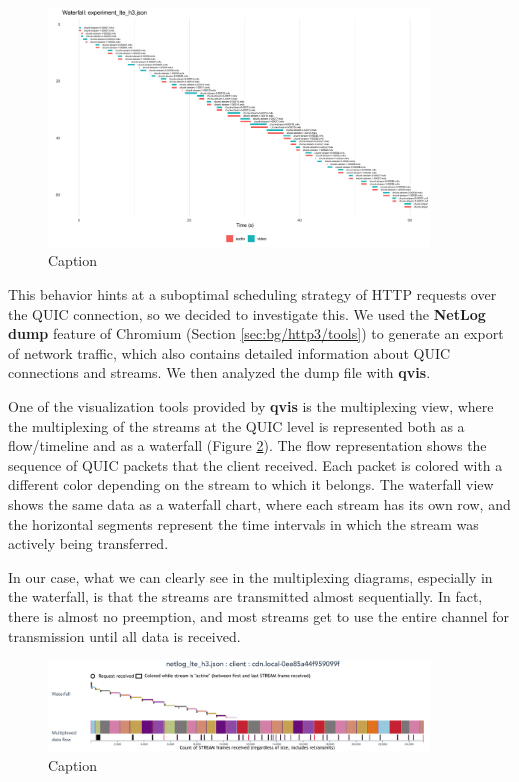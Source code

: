 \begin{figure}[h]
    \centering
    \includegraphics[width=0.9\textwidth]{res/eval_nonabr_lte_h3_waterfall.png}
    \caption{Caption}
    \label{fig:eval_nonabr_lte_h3_waterfall}
\end{figure}

This behavior hints at a suboptimal scheduling strategy of HTTP requests over the QUIC connection, so we decided to investigate this. We used the \textbf{NetLog dump} feature of Chromium (Section \ref{sec:bg/http3/tools}) to generate an export of network traffic, which also contains detailed information about QUIC connections and streams. We then analyzed the dump file with \textbf{qvis}.

One of the visualization tools provided by \textbf{qvis} is the multiplexing view, where the multiplexing of the streams at the QUIC level is represented both as a flow/timeline and as a waterfall (Figure \ref{fig:eval_noabr_qvis1}). The flow representation shows the sequence of QUIC packets that the client received. Each packet is colored with a different color depending on the stream to which it belongs. The waterfall view shows the same data as a waterfall chart, where each stream has its own row, and the horizontal segments represent the time intervals in which the stream was actively being transferred.

In our case, what we can clearly see in the multiplexing diagrams, especially in the waterfall, is that the streams are transmitted almost sequentially. In fact, there is almost no preemption, and most streams get to use the entire channel for transmission until all data is received.

\begin{figure}[h]
    \centering
    \includegraphics[width=0.9\textwidth]{res/eval_nonabr_qvis1.png}
    \caption{Caption}
    \label{fig:eval_noabr_qvis1}
\end{figure}

